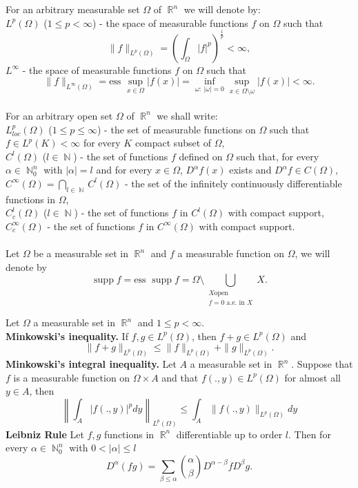 \documentclass[12pt]{article}
\theoremstyle{definition}
\DeclareMathOperator\supp{supp}
\DeclareMathOperator\rr{\mathbb{R}}
\DeclareMathOperator\nn{\mathbb{N}}
\begin{document}
For an arbitrary measurable set $\Omega$ of $\rr^n$ we will denote by:\\
$L^p(\Omega)$ ($1\le p<\infty$) - the space of measurable functions $f$ on $\Omega$ such that 
\[ \|f\|_{L^p(\Omega)}=\left(\int_\Omega |f|^p\right)^\frac{1}{p}<\infty, \]
$L^\infty$ - the space of measurable functions $f$ on $\Omega$ such that
\[ \|f\|_{L^\infty(\Omega)}=\text{ess } \sup_{x \in \Omega} |f(x)|=\inf_{\omega: \  |\omega|=0} \sup_{x \in \Omega\setminus \omega} |f(x)|<\infty.\]\\
For an arbitrary open set $\Omega$ of $\rr^n$ we shall write:\\
$L^p_{loc}(\Omega) $ ($1\le p\le \infty$) - the set of measurable functions on $\Omega$ such that $f \in L^p(K)<\infty$  for every $K$ compact subset of $\Omega,$ 		\\
$C^l(\Omega)$ ($l \in \nn$) - the set of functions $f$ defined on $\Omega$ such that, for every $\alpha \in \nn_0^n$ with $|\alpha|=l$ and for every $x \in \Omega $, $D^\alpha f(x) $ exists and $D^\alpha f \in C(\Omega),$
$C^\infty(\Omega) = \bigcap_{l\in \nn} C^l(\Omega)$ - the set of the infinitely continuously differentiable functions in $\Omega$, \\ 
$C^l_c(\Omega)$ ($l \in \nn$) - the set of functions $f$ in $C^l(\Omega)$ with compact support,\\
$C^\infty_c(\Omega)$  - the set of functions $f$ in $C^\infty(\Omega)$ with compact support.\\\\
Let $\Omega$ be a measurable set in $\rr^n$ and $f$ a measurable function on $\Omega$, we will denote by
\[ \supp f= \text{ess } \supp f= \Omega \setminus \bigcup_{\substack{X \text{open} \\ f=0 \text{ a.e. in } X}} X.\]

Let $\Omega$ a measurable set in $\rr^n$ and $1\le p<\infty.$\\
\textbf{Minkowski's inequality.} If $f,g \in L^p(\Omega)$, then $f+g\in L^p(\Omega)$ and
\[ \|f+g\|_{L^p(\Omega)}\le \|f\|_{L^p(\Omega)}+\|g\|_{L^p(\Omega)}.\]
\textbf{Minkowski's integral inequality.} Let $A$ a measurable set in $\rr^n.$ Suppose that $f$ is a measurable function on $\Omega\times A$ and that $f(.,y) \in L^p(\Omega)$ for almost all $y\in A$, then
\[ \left\| \int_A |f(.,y)|^p dy \right \|_{L^p(\Omega)} \le \int_A \|f(.,y)\|_{L^p(\Omega)}dy\]
\textbf{Leibniz Rule} Let $f,g$ functions in $\rr^n$ differentiable up to order $l$. Then for every $\alpha \in \nn^n_0$ with $0<|\alpha|\le l$
\[ D^\alpha(fg)=\sum_{\beta \le \alpha} {\alpha \choose \beta} D^{\alpha-\beta}fD^\beta g.\]
\end{document}

